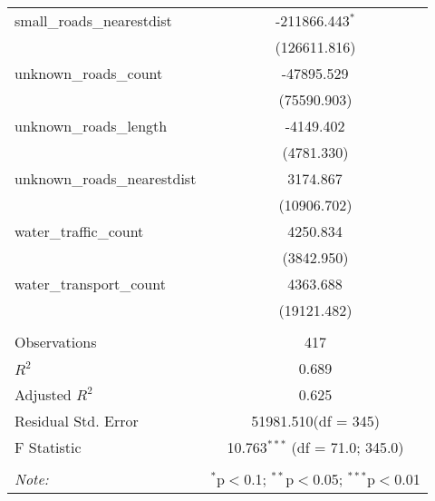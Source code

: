\begin{table}[!htbp]
\begin{tabular}{@{\extracolsep{5pt}}lc}
 small_roads_nearestdist & -211866.443$^{*}$ \\
  & (126611.816) \\
 unknown_roads_count & -47895.529$^{}$ \\
  & (75590.903) \\
 unknown_roads_length & -4149.402$^{}$ \\
  & (4781.330) \\
 unknown_roads_nearestdist & 3174.867$^{}$ \\
  & (10906.702) \\
 water_traffic_count & 4250.834$^{}$ \\
  & (3842.950) \\
 water_transport_count & 4363.688$^{}$ \\
  & (19121.482) \\
\hline \\[-1.8ex]
 Observations & 417 \\
 $R^2$ & 0.689 \\
 Adjusted $R^2$ & 0.625 \\
 Residual Std. Error & 51981.510(df = 345)  \\
 F Statistic & 10.763$^{***}$ (df = 71.0; 345.0) \\
\hline
\hline \\[-1.8ex]
\textit{Note:} & \multicolumn{1}{r}{$^{*}$p$<$0.1; $^{**}$p$<$0.05; $^{***}$p$<$0.01} \\
\end{tabular}
\end{table}